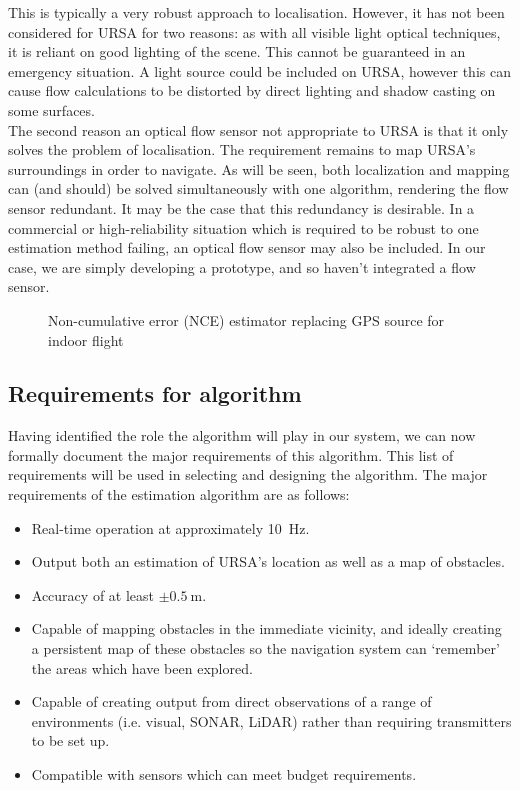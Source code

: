 \documentclass[capstone_report.tex]{subfiles}
\begin{document}
This is typically a very robust approach to localisation. However, it has not been considered for URSA for two reasons: as with all visible light optical techniques, it is reliant on good lighting of the scene. This cannot be guaranteed in an emergency situation. A light source could be included on URSA, however this can cause flow calculations to be distorted by direct lighting and shadow casting on some surfaces.\\

The second reason an optical flow sensor not appropriate to URSA is that it only solves the problem of localisation. The requirement remains to map URSA's surroundings in order to navigate. As will be seen, both localization and mapping can (and should) be solved simultaneously with one algorithm, rendering the flow sensor redundant. It may be the case that this redundancy is desirable. In a commercial or high-reliability situation which is required to be robust to one estimation method failing, an optical flow sensor may also be included. In our case, we are simply developing a prototype, and so haven't integrated a flow sensor.

    \begin{figure}[H]
    	\centering
    	
    	\caption{Non-cumulative error (NCE) estimator replacing GPS source for indoor flight\label{fig:estAlg3}}
    \end{figure}

    \subsection{Requirements for algorithm}
    Having identified the role the algorithm will play in our system, we can now formally document the major requirements of this algorithm. This list of requirements will be used in selecting and designing the algorithm. The major requirements of the estimation algorithm are as follows:

    \begin{itemize}
    	\item Real-time operation at approximately \SI{10}{\hertz}.
    	\item Output both an estimation of URSA's location as well as a map of obstacles.
    	\item Accuracy of at least $\pm \SI{0.5}{\meter}$.
    	\item Capable of mapping obstacles in the immediate vicinity, and ideally creating a persistent map of these obstacles so the navigation system can `remember' the areas which have been explored.
    	\item Capable of creating output from direct observations of a range of environments (i.e. visual, SONAR, LiDAR) rather than requiring transmitters to be set up.
    	\item Compatible with sensors which can meet budget requirements.
    \end{itemize}
\end{document}
